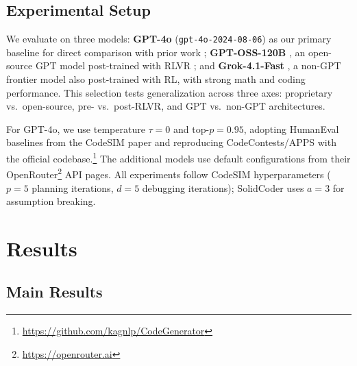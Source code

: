 \documentclass[11pt]{article}
\begin{document}
\subsection{Experimental Setup}
\label{sec:experimental_setup}
We evaluate on three models: \textbf{GPT-4o} (\texttt{gpt-4o-2024-08-06}) as our primary baseline for direct comparison with prior work \citep{islam2025codesim, islam2024mapcoder}; \textbf{GPT-OSS-120B} \citep{agarwal2025gpt}, an open-source GPT model post-trained with RLVR \citep{wang2025reinforcementlearningreasoninglarge}; and \textbf{Grok-4.1-Fast} \citep{xai2025grok4card}, a non-GPT frontier model also post-trained with RL, with strong math and coding performance. This selection tests generalization across three axes: proprietary vs.\ open-source, pre- vs.\ post-RLVR, and GPT vs.\ non-GPT architectures.

For GPT-4o, we use temperature $\tau{=}0$ and top-$p{=}0.95$, adopting HumanEval baselines from the CodeSIM paper and reproducing CodeContests/APPS with the official codebase.\footnote{\url{https://github.com/kagnlp/CodeGenerator}} The additional models use default configurations from their OpenRouter\footnote{\url{https://openrouter.ai}} API pages. All experiments follow CodeSIM hyperparameters ($p{=}5$ planning iterations, $d{=}5$ debugging iterations); SolidCoder uses $a{=}3$ for assumption breaking.

\section{Results}

\subsection{Main Results}
\end{document}
